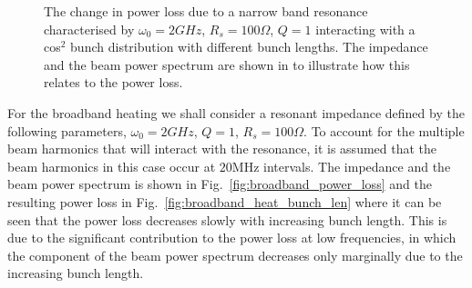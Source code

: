 \documentclass{cernrep}
\begin{document}
\begin{figure}
\caption{ The change in power loss due to a narrow band resonance characterised by $\omega_{0} = 2GHz$, $R_{s} = 100\Omega$, $Q = 1$ interacting with a cos$^{2}$ bunch distribution with different bunch lengths. The impedance and the beam power spectrum are shown in  to illustrate how this relates to the power loss.}
\end{figure}


For the broadband heating we shall consider a resonant impedance defined by the following parameters, $\omega_{0} = 2GHz$, $Q=1$, $R_{s}=100\Omega$. To account for the multiple beam harmonics that will interact with the resonance, it is assumed that the beam harmonics in this case occur at $20$MHz intervals. The impedance and the beam power spectrum is shown in Fig.~\ref{fig:broadband_power_loss} and the resulting power loss in Fig.~\ref{fig:broadband_heat_bunch_len} where it can be seen that the power loss decreases slowly with increasing bunch length. This is due to the significant contribution to the power loss at low frequencies, in which the component of the beam power spectrum decreases only marginally due to the increasing bunch length.
\end{document}
